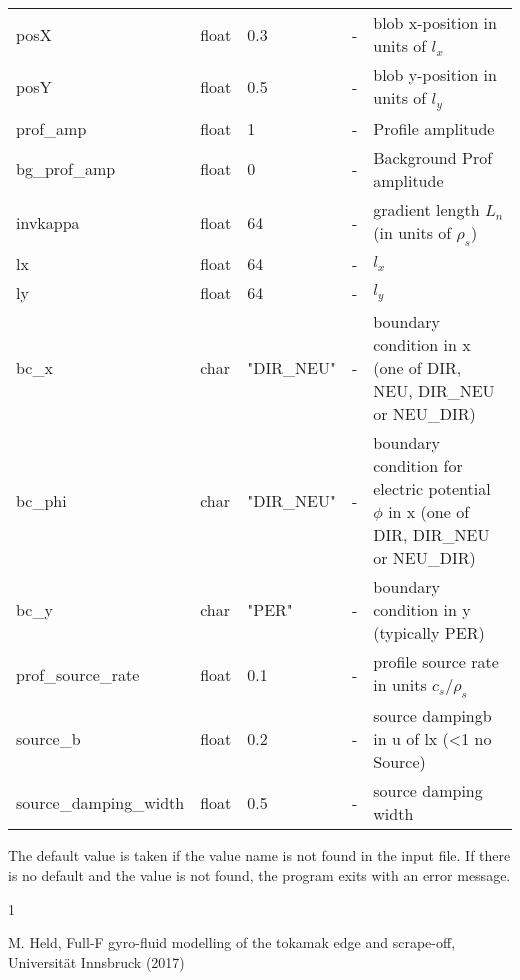 \documentclass{hitec} %
\renewenvironment{thebibliography}[1]{
  \begin{oldthebibliography}{#1}
    \RaggedRight %
    \setlength{\itemsep}{0em}
    \setlength{\parskip}{0em}
}
{
  \end{oldthebibliography}
}
\begin{document}
\begin{longtable}{llll>{\RaggedRight}p{7cm}}
posX       & float &0.3    & - & blob x-position in units of $l_x$\\
posY       & float &0.5    & - & blob y-position in units of $l_y$ \\
prof\_amp    & float &1   & - &Profile amplitude \\
bg\_prof\_amp& float &0   & - &Background Prof amplitude  \\
invkappa   & float &64   & - &gradient length $L_n$ (in units of $\rho_s$)   \\
lx         & float &64   & - & $l_x$  \\
ly         & float &64  & - & $l_y$  \\
bc\_x   & char & "DIR\_NEU"      & - & boundary condition in x (one of DIR, NEU, DIR\_NEU or NEU\_DIR) \\
bc\_phi   & char & "DIR\_NEU"      & - & boundary condition for electric potential $\phi$ in x (one of  DIR, DIR\_NEU or NEU\_DIR) \\
bc\_y   & char & "PER"      & - & boundary condition in y (typically PER) \\
prof\_source\_rate     & float &0.1  & - & profile source rate in units $c_s/\rho_s$ \\
source\_b             & float &0.2  & - & source dampingb in u of lx (<1 no Source)  \\
source\_damping\_width & float &0.5  & - & source damping width  \\
\bottomrule
\end{longtable}

The default value is taken if the value name is not found in the input file. If there is no default and
the value is not found,
the program exits with an error message.
\begin{thebibliography}{1}
  M. Held, Full-F gyro-fluid modelling of the tokamak edge and scrape-off, Universit{\"a}t Innsbruck (2017)
\end{thebibliography}
\end{document}
